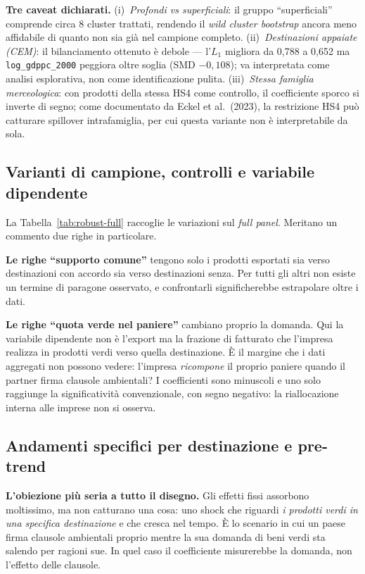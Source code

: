 \documentclass[11pt,a4paper]{article}
\begin{document}
\textbf{Tre caveat dichiarati.} (i)~\emph{Profondi vs superficiali}: il gruppo
``superficiali'' comprende circa 8 cluster trattati, rendendo il \emph{wild cluster bootstrap}
ancora meno affidabile di quanto non sia gi\`a nel campione completo. (ii)~\emph{Destinazioni
appaiate (CEM)}: il bilanciamento ottenuto \`e debole --- l'$L_1$ migliora da 0,788 a 0,652 ma
\texttt{log\_gdppc\_2000} peggiora oltre soglia (SMD $-0{,}108$); va interpretata come analisi
esplorativa, non come identificazione pulita. (iii)~\emph{Stessa famiglia merceologica}: con
prodotti della stessa HS4 come controllo, il coefficiente sporco si inverte di segno; come
documentato da Eckel et al.\ (2023), la restrizione HS4 pu\`o catturare spillover
intrafamiglia, per cui questa variante non \`e interpretabile da sola.



\clearpage
\subsection{Varianti di campione, controlli e variabile dipendente}

La Tabella~\ref{tab:robust-full} raccoglie le variazioni sul \emph{full panel}. Meritano un
commento due righe in particolare.

\textbf{Le righe ``supporto comune''} tengono solo i prodotti esportati sia verso
destinazioni con accordo sia verso destinazioni senza. Per tutti gli altri non esiste un
termine di paragone osservato, e confrontarli significherebbe estrapolare oltre i dati.

\textbf{Le righe ``quota verde nel paniere''} cambiano proprio la domanda. Qui la variabile
dipendente non \`e l'export ma la frazione di fatturato che l'impresa realizza in prodotti
verdi verso quella destinazione. \`E il margine che i dati aggregati non possono vedere:
l'impresa \emph{ricompone} il proprio paniere quando il partner firma clausole ambientali?
I coefficienti sono minuscoli e uno solo raggiunge la significativit\`a convenzionale, con
segno negativo: la riallocazione interna alle imprese non si osserva.



\clearpage
\subsection{Andamenti specifici per destinazione e pre-trend}

\textbf{L'obiezione pi\`u seria a tutto il disegno.} Gli effetti fissi assorbono moltissimo,
ma non catturano una cosa: uno shock che riguardi \emph{i prodotti verdi in una specifica
destinazione} e che cresca nel tempo. \`E lo scenario in cui un paese firma clausole
ambientali proprio mentre la sua domanda di beni verdi sta salendo per ragioni sue. In quel
caso il coefficiente misurerebbe la domanda, non l'effetto delle clausole.
\end{document}
